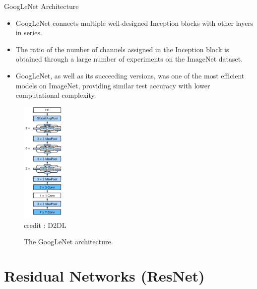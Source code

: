 \begin{vbframe}{GoogLeNet Architecture}
    \begin{itemize}
        \item GoogLeNet connects multiple well-designed Inception blocks with other layers in series. 
        \item The ratio of the number of channels assigned in the Inception block is obtained through a large number of experiments on the ImageNet dataset.
        \item GoogLeNet, as well as its succeeding versions, was one of the most efficient models on ImageNet, providing similar test accuracy with lower computational complexity.
    \end{itemize}
    \framebreak
    
  \begin{figure}
  \centering
    \includegraphics[width=2cm]{plots/moderncnn/inception-full.png}
    \tiny{\\ credit : D2DL}
    \caption{The GoogLeNet architecture.}
  \end{figure}
    
\end{vbframe}


\section{Residual Networks (ResNet)}


